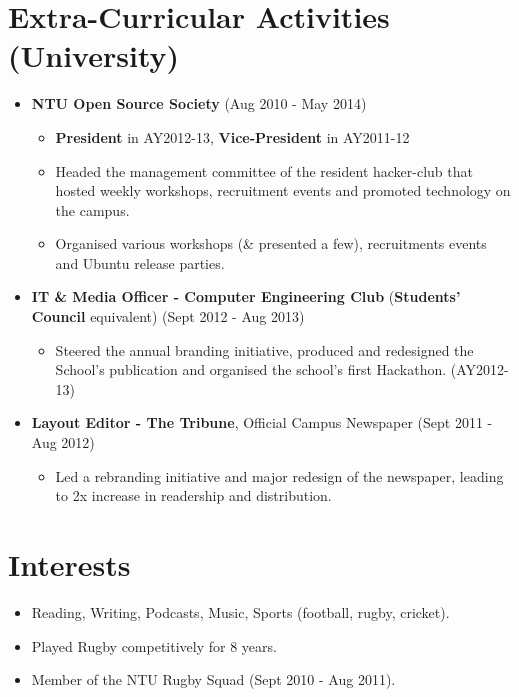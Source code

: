 \section{Extra-Curricular Activities
(University)}\label{extra-curricular-activities-university}

\begin{itemize}
\tightlist
\item
  \textbf{NTU Open Source Society} \hfill (Aug 2010 - May 2014)

  \begin{itemize}
  \tightlist
  \item
    \textbf{President} in AY2012-13, \textbf{Vice-President} in
    AY2011-12
  \item
    Headed the management committee of the resident hacker-club that
    hosted weekly workshops, recruitment events and promoted technology
    on the campus.
  \item
    Organised various workshops (\& presented a few), recruitments
    events and Ubuntu release parties.
  \end{itemize}
\item
  \textbf{IT \& Media Officer - Computer Engineering Club}
  (\textbf{Students' Council} equivalent) \hfill (Sept 2012 - Aug 2013)

  \begin{itemize}
  \tightlist
  \item
    Steered the annual branding initiative, produced and redesigned the
    School's publication and organised the school's first Hackathon.
    (AY2012-13)
  \end{itemize}
\item
  \textbf{Layout Editor - The Tribune}, Official Campus Newspaper
  \hfill (Sept 2011 - Aug 2012)

  \begin{itemize}
  \tightlist
  \item
    Led a rebranding initiative and major redesign of the newspaper,
    leading to 2x increase in readership and distribution.
  \end{itemize}
\end{itemize}

\section{Interests}\label{interests}

\begin{itemize}
\tightlist
\item
  Reading, Writing, Podcasts, Music, Sports (football, rugby, cricket).
\item
  Played Rugby competitively for 8 years.
\item
  Member of the NTU Rugby Squad (Sept 2010 - Aug 2011).
\end{itemize}
